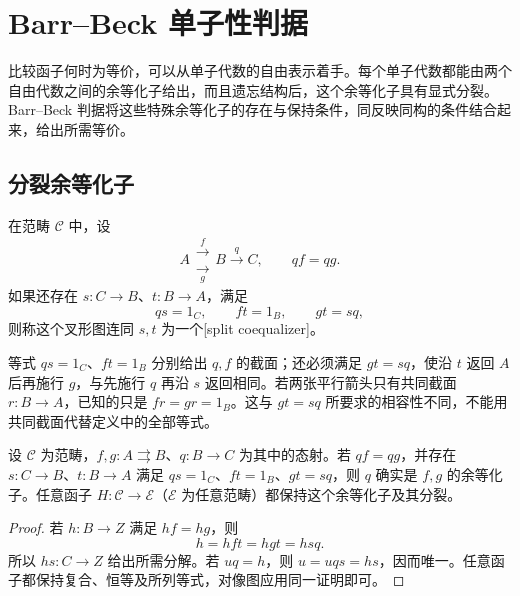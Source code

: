 

\section{Barr–Beck 单子性判据}
\label{b4:sec:A03}

比较函子何时为等价，可以从单子代数的自由表示着手。每个单子代数都能由两个自由代数之间的余等化子给出，而且遗忘结构后，这个余等化子具有显式分裂。Barr–Beck 判据将这些特殊余等化子的存在与保持条件，同反映同构的条件结合起来，给出所需等价。

\subsection{分裂余等化子}
\label{b4:subsec:A03:01}

\begin{definition}\label{b4:def:A-split-coequalizer}
	在范畴 \(\mathcal C\) 中，设
	\[
		A\mathrel{\substack{\xrightarrow{\ f\ }\\[-0.4ex]\xrightarrow[\ g\ ]{}}}B \xrightarrow{q}C,\qquad qf=qg.
	\]
	如果还存在 \(s:C\to B\)、\(t:B\to A\)，满足
	\begin{equation}\label{b4:eq:A-split-coequalizer}
		qs=1_C,\qquad ft=1_B,\qquad gt=sq,
	\end{equation}
	则称这个叉形图连同 \(s,t\) 为一个[split coequalizer]。
\end{definition}

等式 \(qs=1_C\)、\(ft=1_B\) 分别给出 \(q,f\) 的截面；还必须满足 \(gt=sq\)，使沿 \(t\) 返回 \(A\) 后再施行 \(g\)，与先施行 \(q\) 再沿 \(s\) 返回相同。若两张平行箭头只有共同截面 \(r:B\rightarrow A\)，已知的只是 \(fr=gr=1_B\)。这与 \(gt=sq\) 所要求的相容性不同，不能用共同截面代替定义中的全部等式。

\begin{lemma}\label{b4:lem:A-split-absolute}
	设 \(\mathcal C\) 为范畴，\(f,g:A\rightrightarrows B\)、\(q:B\to C\) 为其中的态射。若 \(qf=qg\)，并存在 \(s:C\to B\)、\(t:B\to A\) 满足 \(qs=1_C\)、\(ft=1_B\)、\(gt=sq\)，则 \(q\) 确实是 \(f,g\) 的余等化子。任意函子 \(H:\mathcal C\to\mathcal E\)（\(\mathcal E\) 为任意范畴）都保持这个余等化子及其分裂。
\end{lemma}
\begin{proof}
	若 \(h:B\to Z\) 满足 \(hf=hg\)，则
	\[
		h=hft=hgt=hsq.
	\]
	所以 \(hs:C\to Z\) 给出所需分解。若 \(uq=h\)，则 \(u=uqs=hs\)，因而唯一。任意函子都保持复合、恒等及所列等式，对像图应用同一证明即可。
\end{proof}


